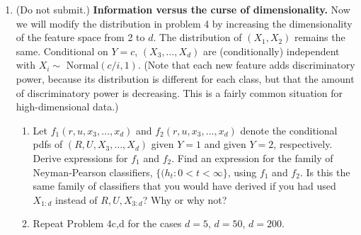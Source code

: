 \documentclass[11pt]{report}
\DeclareMathOperator{\Prob}{\mathbb{P}}
\begin{document}
\begin{enumerate}[1.]
\begin{enumerate}
		      \item (Approximately) compute and plot the optimal ROC curve traced out by the family of Neyman-Pearson classifiers.  Do this by generating $n=10^5$ iid samples from $(X,Y)$, called the {\em test data set}, and estimating the DR (detection rate) and FAR (false alarm rate) for each $h_t$ as you vary $t$ to trace out the ROC curve.\footnote{You should only create a single test data set, i.e., you should use the same test data set for each $h_t$: For each $t$, you compute $h_t$ on all $10^5$ feature vectors ($X$) and compare $h_t$ to the true class labels ($Y$) to approximate DR and FAR. One issue is how to choose an appropriate grid of $t$ values. A good strategy is to first compute $f_2/f_1$ on all $10^5$ test data points, sort the ratios, and choose every 100th value, to get a list of $1000$ candidate values of $t$. Include the values $-\infty$ and $\infty$ in your list of $t$ to get the points $(1,1)$ and $(0,0)$ on your ROC curve. Linearly interpolate points on the ROC curve so that you draw a smooth curve.}
		      \item Approximately, what is the optimal classification error rate, i.e, $\inf_h \Prob(h(X)\neq Y)$, where the infimum is taken over all possible classifiers?  What classifier achieves this optimal error rate?
	      \end{enumerate}


	      \pagebreak


	\item {\color{blue} (Do not submit.)} {\bf Information versus the curse of dimensionality.} Now we will modify the distribution in problem 4 by increasing the dimensionality of the feature space from 2 to $d$.  The distribution of $(X_1,X_2)$ remains the same.  Conditional on $Y=c$, $(X_3,\dotsc,X_d)$ are (conditionally) independent with $X_i\sim $ Normal$(c/i,1)$.  (Note that each new feature adds discriminatory power, because its distribution is different for each class, but that the amount of discriminatory power is decreasing.  This is a fairly common situation for high-dimensional data.)
	      \begin{enumerate}
		      \item Let $f_1(r,u,x_3,\dotsc,x_d)$ and $f_2(r,u,x_3,\dotsc,x_d)$ denote the conditional pdfs of $(R,U,X_3,\dotsc,X_d)$ given $Y=1$ and given $Y=2$, respectively.  Derive expressions for $f_1$ and $f_2$.  Find an expression for the family of Neyman-Pearson classifiers, $\{(h_t : 0 < t < \infty\}$, using $f_1$ and $f_2$.  Is this the same family of classifiers that you would have derived if you had used $X_{1:d}$ instead of $R,U,X_{3:d}$?  Why or why not?
		      \item Repeat Problem 4c,d for the cases $d=5$, $d=50$, $d=200$.
	      \end{enumerate}



\end{enumerate}
\end{document}
